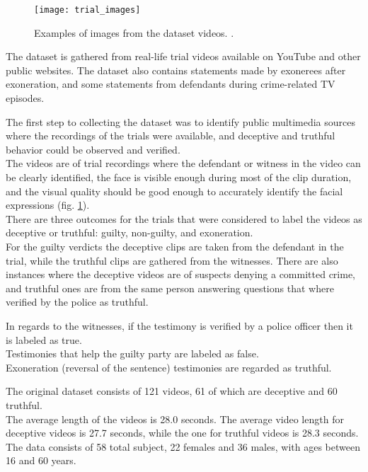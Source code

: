 \begin{figure}[H]
	\centering
	\texttt{[image: trial\_images]}
	\caption{Examples of images from the dataset videos. \cite{Perez-Rosas:2015:DDU:2818346.2820758}.}
	\label{fig:trial_images}
\end{figure}


The dataset is gathered from real-life trial videos available on YouTube and other public websites. The dataset also contains statements made by exonerees after exoneration, and some statements from defendants during crime-related TV episodes.

The first step to collecting the dataset was to identify public multimedia sources where the recordings of the trials were available, and deceptive and truthful behavior could be observed and verified.\\
The videos are of trial recordings where the defendant or witness in the video can be clearly identified, the face is visible enough during most of the clip duration, and the visual quality should be good enough to accurately identify the facial expressions (fig. \ref{fig:trial_images}).\\
There are three outcomes for the trials that were considered to label the videos as deceptive or truthful: guilty, non-guilty, and exoneration. \\
For the guilty verdicts the deceptive clips are taken from the defendant in the trial, while the truthful clips are gathered from the witnesses. There are also instances where the deceptive videos are of suspects denying a committed crime, and truthful ones are from the same person answering questions that where verified by the police as truthful.

In regards to the witnesses, if the testimony is verified by a police officer then it is labeled as true. \\ 
Testimonies that help the guilty party are labeled as false. \\
Exoneration (reversal of the sentence) testimonies are regarded as truthful.

The original dataset consists of 121 videos, 61 of which are deceptive and 60 truthful. \\
The average length of the videos is 28.0 seconds. The average video length for deceptive videos is 27.7 seconds, while the one for truthful videos is 28.3 seconds. \\
The data consists of 58 total subject, 22 females and 36 males, with ages between 16 and 60 years.

